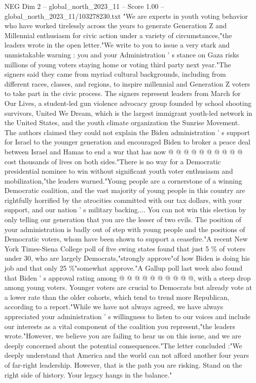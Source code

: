 \begin{textsample}{NEG Dim 2 – global\_north\_2023\_11 – Score 1.00 – global\_north\_2023\_11/103278230.txt}  \label{ex:f2_neg_211}
"We are experts in youth voting behavior who have worked tirelessly across the years to generate Generation Z and Millennial enthusiasm for civic action under a variety of circumstances,"the leaders wrote in the open letter."We write to you to issue a very stark and unmistakable warning : you and your Administration ' s stance on Gaza risks millions of young voters staying home or voting third party next year."The signers said they came from myriad cultural backgrounds, including from different races, classes, and regions, to inspire millennial and Generation Z voters to take part in the civic process.
The signers represent leaders from March for Our Lives, a student-led gun violence advocacy group founded by school shooting survivors, United We Dream, which is the largest immigrant youth-led network in the United States, and the youth climate organization the Sunrise Movement.
The authors claimed they could not explain the Biden administration ' s support for Israel to the younger generation and encouraged Biden to broker a peace deal between Israel and Hamas to end a war that has now @ @ @ @ @ @ @ @ @ @ cost thousands of lives on both sides."There is no way for a Democratic presidential nominee to win without significant youth voter enthusiasm and mobilization,"the leaders warned."Young people are a cornerstone of a winning Democratic coalition, and the vast majority of young people in this country are rightfully horrified by the atrocities committed with our tax dollars, with your support, and our nation ' s military backing....
You can not win this election by only telling our generation that you are the lesser of two evils.
The position of your administration is badly out of step with young people and the positions of Democratic voters, whom have been shown to support a ceasefire."A recent New York Times-Siena College poll of five swing states found that just 5 \% of voters under 30, who are largely Democrats,"strongly approve"of how Biden is doing his job and that only 25 \%"somewhat approve."A Gallup poll last week also found that Biden ' s approval rating among @ @ @ @ @ @ @ @ @ @, with a steep drop among young voters.
Younger voters are crucial to Democrats but already vote at a lower rate than the older cohorts, which tend to trend more Republican, according to a report."While we have not always agreed, we have always appreciated your administration ' s willingness to listen to our voices and include our interests as a vital component of the coalition you represent,"the leaders wrote."However, we believe you are failing to hear us on this issue, and we are deeply concerned about the potential consequences."The letter concluded :"We deeply understand that America and the world can not afford another four years of far-right leadership.
However, that is the path you are risking.
Stand on the right side of history.
Your legacy hangs in the balance."

\end{textsample}
